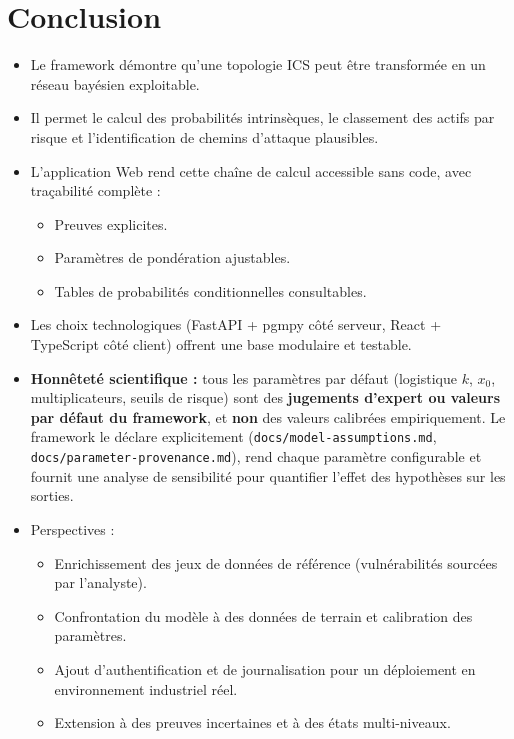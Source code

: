 \documentclass[12pt,a4paper]{article}
\newcommand{\forcereset}[1]{%
    \needspace{#1\baselineskip}%
}
\begin{document}
\newpage

\section{Conclusion}
\forcereset{7}

\begin{itemize}[leftmargin=1.2cm, itemsep=0.2\baselineskip]
    \item Le framework démontre qu'une topologie ICS peut être transformée en un réseau bayésien exploitable.
    \item Il permet le calcul des probabilités intrinsèques, le classement des actifs par risque et l'identification de chemins d'attaque plausibles.
    \item L'application Web rend cette chaîne de calcul accessible sans code, avec traçabilité complète :
        \begin{itemize}
            \item Preuves explicites.
            \item Paramètres de pondération ajustables.
            \item Tables de probabilités conditionnelles consultables.
        \end{itemize}
    \item Les choix technologiques (FastAPI + pgmpy côté serveur, React + TypeScript côté client) offrent une base modulaire et testable.
    \item \textbf{Honnêteté scientifique :} tous les paramètres par défaut (logistique $k$, $x_0$, multiplicateurs, seuils de risque) sont des \textbf{jugements d'expert ou valeurs par défaut du framework}, et \textbf{non} des valeurs calibrées empiriquement. Le framework le déclare explicitement (\texttt{docs/model-assumptions.md}, \texttt{docs/parameter-provenance.md}), rend chaque paramètre configurable et fournit une analyse de sensibilité pour quantifier l'effet des hypothèses sur les sorties.
    \item Perspectives :
        \begin{itemize}
            \item Enrichissement des jeux de données de référence (vulnérabilités sourcées par l'analyste).
            \item Confrontation du modèle à des données de terrain et calibration des paramètres.
            \item Ajout d'authentification et de journalisation pour un déploiement en environnement industriel réel.
            \item Extension à des preuves incertaines et à des états multi-niveaux.
        \end{itemize}
\end{itemize}
\end{document}
